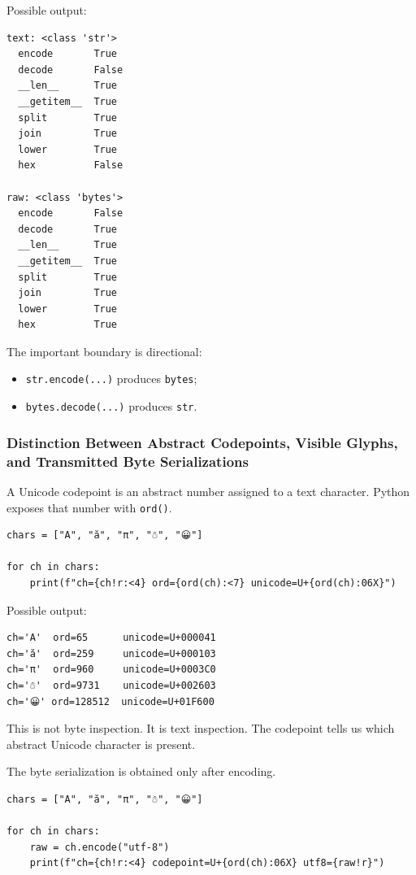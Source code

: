 Possible output:

\begin{verbatim}
text: <class 'str'>
  encode       True
  decode       False
  __len__      True
  __getitem__  True
  split        True
  join         True
  lower        True
  hex          False

raw: <class 'bytes'>
  encode       False
  decode       True
  __len__      True
  __getitem__  True
  split        True
  join         True
  lower        True
  hex          True
\end{verbatim}

The important boundary is directional:

\begin{itemize}
    \item \texttt{str.encode(...)} produces \texttt{bytes};
    \item \texttt{bytes.decode(...)} produces \texttt{str}.
\end{itemize}

\subsubsection{Distinction Between Abstract Codepoints, Visible Glyphs, and Transmitted Byte Serializations}

A Unicode codepoint is an abstract number assigned to a text character. Python exposes that number with \texttt{ord()}.

\begin{verbatim}
chars = ["A", "ă", "π", "☃", "😀"]

for ch in chars:
    print(f"ch={ch!r:<4} ord={ord(ch):<7} unicode=U+{ord(ch):06X}")
\end{verbatim}

Possible output:

\begin{verbatim}
ch='A'  ord=65      unicode=U+000041
ch='ă'  ord=259     unicode=U+000103
ch='π'  ord=960     unicode=U+0003C0
ch='☃'  ord=9731    unicode=U+002603
ch='😀' ord=128512  unicode=U+01F600
\end{verbatim}

This is not byte inspection. It is text inspection. The codepoint tells us which abstract Unicode character is present.

The byte serialization is obtained only after encoding.

\begin{verbatim}
chars = ["A", "ă", "π", "☃", "😀"]

for ch in chars:
    raw = ch.encode("utf-8")
    print(f"ch={ch!r:<4} codepoint=U+{ord(ch):06X} utf8={raw!r}")
\end{verbatim}

